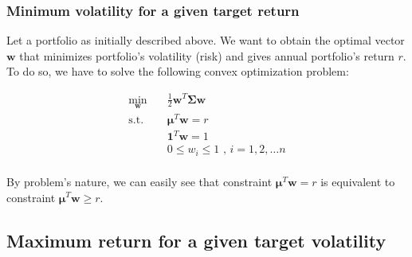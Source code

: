 \documentclass{beamer}
\begin{document}
\begin{frame}
\frametitle{\textbf{Minimum volatility for a given target return}}

\justifying
Let a portfolio as initially described above. We want to obtain the optimal vector $\mathbf{w}$ that minimizes portfolio's volatility (risk) and gives annual portfolio's return $r$. To do so, we have to solve the following convex optimization problem:

\vspace{0.2cm}
\justifying
\begin{equation}
\begin{aligned}
\label{eq:2}
\min_{\mathbf{w}} \quad & \frac{1}{2}\mathbf{w}^{T}\mathbf{\Sigma}\mathbf{w} \\
\textrm{s.t.} \quad & \boldsymbol\mu^{T} \mathbf{w} = r \\
                             & \mathbf{1}^{T} \mathbf{w} = 1 \\
                             & 0 \leq w_{i} \leq 1 \textrm{ , } i = 1, 2, \dots n \\
\end{aligned}
\end{equation}


\vspace{0.2cm}
\justifying
By problem's nature, we can easily see that constraint $\boldsymbol\mu^{T} \mathbf{w} = r$ is equivalent to constraint $\boldsymbol\mu^{T} \mathbf{w} \geq r$.

\end{frame}






\subsection{Maximum return for a given target volatility}
\end{document}
